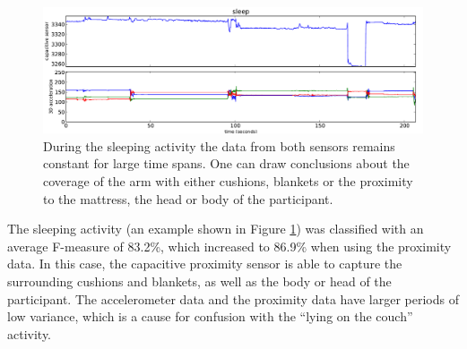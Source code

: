 \documentclass[runningheads,a4paper]{llncs}
\begin{document}
\begin{figure}[t]
	\centering
		\includegraphics[width=1.00\textwidth]{../Auswertung/images/eugen_9.pdf}
	\caption{During the sleeping activity the data from both sensors remains constant for large time spans. One can draw conclusions about the coverage of the arm with either cushions, blankets or the proximity to the mattress, the head or body of the participant.}
	\label{fig:sleeping}
\end{figure}

The sleeping activity (an example shown in Figure \ref{fig:sleeping}) was classified with an average F-measure of 83.2\%, which increased to 86.9\% when using the proximity data. In this case, the capacitive proximity sensor is able to capture the surrounding cushions and blankets, as well as the body or head of the participant. The accelerometer data and the proximity data have larger periods of low variance, which is a cause for confusion with the ``lying on the couch'' activity.
\end{document}
